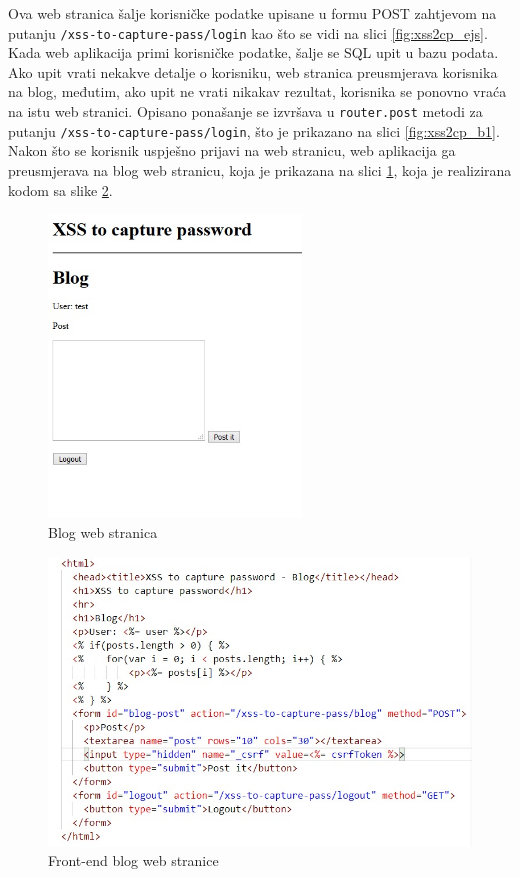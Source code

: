 \documentclass[12pt, oneside, onecolumn]{book}
\begin{document}
{Ova web stranica šalje korisničke podatke upisane u formu POST zahtjevom na putanju \texttt{/xss-to-capture-pass/login} kao što se vidi na slici \ref{fig:xss2cp_ejs}. Kada web aplikacija primi korisničke podatke, šalje se SQL upit u bazu podata. Ako upit vrati nekakve detalje o korisniku, web stranica preusmjerava korisnika na blog, međutim, ako upit ne vrati nikakav rezultat, korisnika se ponovno vraća na istu web stranici. Opisano ponašanje se izvršava u \texttt{router.post} metodi za putanju \texttt{/xss-to-capture-pass/login}, što je prikazano na slici \ref{fig:xss2cp_b1}. Nakon što se korisnik uspješno prijavi na web stranicu, web aplikacija ga preusmjerava na blog web stranicu, koja je prikazana na slici \ref{fig:xss2cp_blog}, koja je realizirana kodom sa slike \ref{fig:xss2cp_blog_f}.

\begin{figure}[H]
	\begin{center}
		\includegraphics[width=0.6\textwidth]{xss2cp_blog.jpg}
		\caption{Blog web stranica} \label{fig:xss2cp_blog}
	\end{center}
\end{figure}

\begin{figure}[H]
	\begin{center}
		\includegraphics[width=\textwidth]{xss2cp_blog_f.jpg}
		\caption{Front-end blog web stranice} \label{fig:xss2cp_blog_f}
	\end{center}
\end{figure}

}
\end{document}
